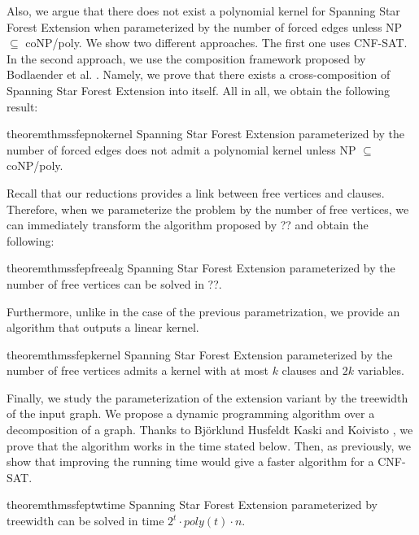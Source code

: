 \documentclass[en]{pracamgr}
\theoremstyle{definition}
\newcommand{\ssfep}{{\sc Spanning Star Forest Extension}}
\newcommand{\cnfsat}{{\sc CNF-SAT}}
\begin{document}
\noindent
Also, we argue that there does not exist a polynomial kernel for \ssfep{} when parameterized by the number of forced edges unless NP $\subseteq$ coNP/poly. We show two different approaches. The first one uses \cnfsat{}. In the second approach, we use the composition framework proposed by Bodlaender et al. \cite{Bodlaender}. Namely, we prove that there exists a cross-composition of \ssfep{} into itself. All in all, we obtain the following result:

\begin{restatable}{theorem}{thmssfepnokernel}\label{thm-ssfep-nokernel}
	\ssfep{} parameterized by the number of forced edges does not admit a polynomial kernel unless NP $\subseteq$ coNP/poly.
\end{restatable}

Recall that our reductions provides a link between free vertices and clauses. Therefore, when we parameterize the problem by the number of free vertices, we can immediately transform the algorithm proposed by ?? and obtain the following: %

\begin{restatable}{theorem}{thmssfepfreealg}\label{thm-ssfep-free-alg}
	\ssfep{} parameterized by the number of free vertices can be solved in ??.%
\end{restatable}

\noindent
Furthermore, unlike in the case of the previous parametrization, we provide an algorithm that outputs a linear kernel.

\begin{restatable}{theorem}{thmssfepkernel}\label{thm-ssfep-kernel}
	\ssfep{} parameterized by the number of free vertices admits a kernel with at most $k$ clauses and $2k$ variables.
\end{restatable}

Finally, we study the parameterization of the extension variant by the treewidth of the input graph. We propose a dynamic programming algorithm over a decomposition of a graph. Thanks to Björklund Husfeldt Kaski and Koivisto \cite{Cover product}, we prove that the algorithm works in the time stated below. Then, as previously, we show that improving the running time would give a faster algorithm for a \cnfsat{}.

\begin{restatable}{theorem}{thmssfeptwtime}\label{thm-ssfep-tw-time}
	\ssfep{} parameterized by treewidth can be solved in time $2^t\cdot poly(t)\cdot n$.
\end{restatable}
\end{document}
